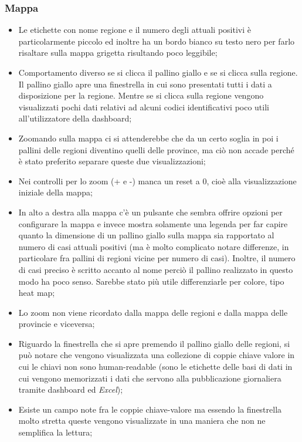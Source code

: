 \subsubsection{Mappa}
\label{sss:mappa}
\begin{itemize}
    \item Le etichette con nome regione e il numero degli attuali positivi è particolarmente piccolo ed inoltre ha un bordo bianco su testo nero per farlo risaltare sulla mappa grigetta risultando poco leggibile;
    \item Comportamento diverso se si clicca il pallino giallo e se si clicca sulla regione. Il pallino giallo apre una finestrella in cui sono presentati tutti i dati a disposizione per la regione. Mentre se si clicca sulla regione vengono visualizzati pochi dati relativi ad alcuni codici identificativi poco utili all'utilizzatore della dashboard;
    \item Zoomando sulla mappa ci si attenderebbe che da un certo soglia in poi i pallini delle regioni diventino quelli delle province, ma ciò non accade perché è stato preferito separare queste due visualizzazioni;
    \item Nei controlli per lo zoom (+ e -) manca un reset a 0, cioè alla visualizzazione iniziale della mappa;
    \item In alto a destra alla mappa c'è un pulsante che sembra offrire opzioni per configurare la mappa e invece mostra solamente una legenda per far capire quanto la dimensione di un pallino giallo sulla mappa sia rapportato al numero di casi attuali positivi (ma è molto complicato notare differenze, in particolare fra pallini di regioni vicine per numero di casi). Inoltre, il numero di casi preciso è scritto accanto al nome perciò il pallino realizzato in questo modo ha poco senso. Sarebbe stato più utile differenziarle per colore, tipo heat map;
    \item Lo zoom non viene ricordato dalla mappa delle regioni e dalla mappa delle provincie e viceversa;
    \item Riguardo la finestrella che si apre premendo il pallino giallo delle regioni, si può notare che vengono visualizzata una collezione di coppie chiave valore in cui le chiavi non sono human-readable (sono le etichette delle basi di dati in cui vengono memorizzati i dati che servono alla pubblicazione giornaliera tramite dashboard ed \textit{Excel});
    \item Esiste un campo note fra le coppie chiave-valore ma essendo la finestrella molto stretta queste vengono visualizzate in una maniera che non ne semplifica la lettura;

\end{itemize}
